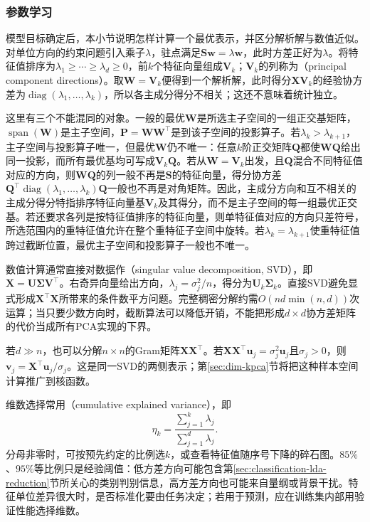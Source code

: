 \subsubsection{参数学习}
\label{sec:dim-pca-learning}

模型目标确定后，本小节说明怎样计算一个最优表示，并区分解析解与数值近似。对单位方向的约束问题引入乘子$\lambda$，驻点满足$\bm{S}\bm{w}=\lambda\bm{w}$，此时方差正好为$\lambda$。将特征值排序为$\lambda_1\geq\cdots\geq\lambda_d\geq0$，前$k$个特征向量组成$\bm{V}_k$；$\bm{V}_k$的列称为（principal component directions）。取$\bm{W}=\bm{V}_k$便得到一个解析解，此时得分$\bm{X}\bm{V}_k$的经验协方差为$\operatorname{diag}(\lambda_1,\ldots,\lambda_k)$，所以各主成分得分不相关；这还不意味着统计独立。

这里有三个不能混同的对象。一般的最优$\bm{W}$是所选主子空间的一组正交基矩阵，$\operatorname{span}(\bm{W})$是主子空间，$\bm{P}=\bm{W}\bm{W}^{\top}$是到该子空间的投影算子。若$\lambda_k>\lambda_{k+1}$，主子空间与投影算子唯一，但最优$\bm{W}$仍不唯一：任意$k$阶正交矩阵$\bm{Q}$都使$\bm{W}\bm{Q}$给出同一投影，而所有最优基均可写成$\bm{V}_k\bm{Q}$。若从$\bm{W}=\bm{V}_k$出发，且$\bm{Q}$混合不同特征值对应的方向，则$\bm{W}\bm{Q}$的列一般不再是$\bm{S}$的特征向量，得分协方差$\bm{Q}^{\top}\operatorname{diag}(\lambda_1,\ldots,\lambda_k)\bm{Q}$一般也不再是对角矩阵。因此，主成分方向和互不相关的主成分得分特指排序特征向量基$\bm{V}_k$及其得分，而不是主子空间的每一组最优正交基。若还要求各列是按特征值排序的特征向量，则单特征值对应的方向只差符号，所选范围内的重特征值允许在整个重特征子空间中旋转。若$\lambda_k=\lambda_{k+1}$使重特征值跨过截断位置，最优主子空间和投影算子一般也不唯一。

数值计算通常直接对数据作（singular value decomposition, SVD），即$\bm{X}=\bm{U}\bm{\Sigma}\bm{V}^{\top}$。右奇异向量给出方向，$\lambda_j=\sigma_j^2/n$，得分为$\bm{U}_k\bm{\Sigma}_k$。直接SVD避免显式形成$\bm{X}^{\top}\bm{X}$所带来的条件数平方问题。完整稠密分解约需$O(nd\min(n,d))$次运算；当只要少数方向时，截断算法可以降低开销，不能把形成$d\times d$协方差矩阵的代价当成所有PCA实现的下界。

若$d\gg n$，也可以分解$n\times n$的Gram矩阵$\bm{X}\bm{X}^{\top}$。若$\bm{X}\bm{X}^{\top}\bm{u}_j=\sigma_j^2\bm{u}_j$且$\sigma_j>0$，则$\bm{v}_j=\bm{X}^{\top}\bm{u}_j/\sigma_j$。这是同一SVD的两侧表示；第\ref{sec:dim-kpca}节将把这种样本空间计算推广到核函数。

维数选择常用（cumulative explained variance），即
\begin{equation}
  \eta_k=\frac{\sum_{j=1}^{k}\lambda_j}
                    {\sum_{j=1}^{d}\lambda_j}.
  \label{eq:dim-explained-variance}
\end{equation}
分母非零时，可按预先约定的比例选$k$，或查看特征值随序号下降的碎石图。$85\%$、$95\%$等比例只是经验阈值：低方差方向可能包含第\ref{sec:classification-lda-reduction}节所关心的类别判别信息，高方差方向也可能来自量纲或背景干扰。特征单位差异很大时，是否标准化要由任务决定；若用于预测，应在训练集内部用验证性能选择维数。

